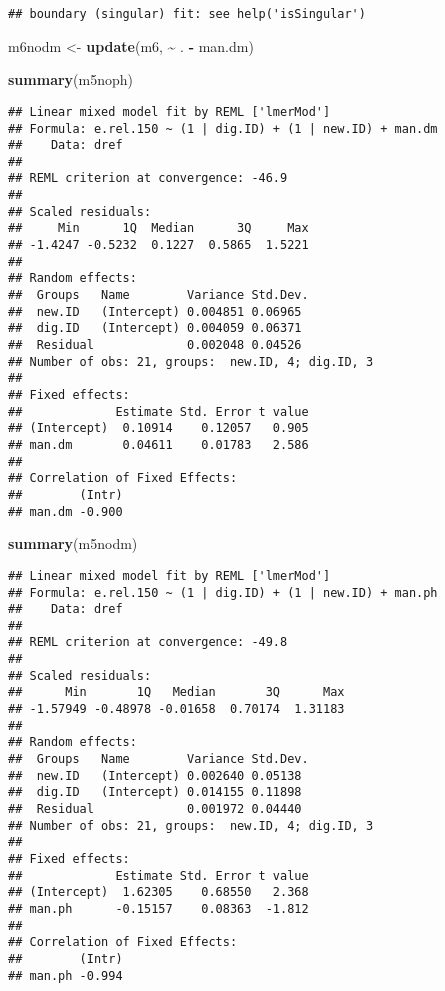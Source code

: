 \documentclass[
]{article}
\newenvironment{Shaded}{\begin{snugshade}}{\end{snugshade}}
\newcommand{\FunctionTok}[1]{\textcolor[rgb]{0.13,0.29,0.53}{\textbf{#1}}}
\newcommand{\NormalTok}[1]{#1}
\newcommand{\OtherTok}[1]{\textcolor[rgb]{0.56,0.35,0.01}{#1}}
\newcommand{\SpecialCharTok}[1]{\textcolor[rgb]{0.81,0.36,0.00}{\textbf{#1}}}
\begin{document}
\begin{verbatim}
## boundary (singular) fit: see help('isSingular')
\end{verbatim}

\begin{Shaded}
\begin{Highlighting}[]
\NormalTok{m6nodm }\OtherTok{\textless{}{-}} \FunctionTok{update}\NormalTok{(m6, }\SpecialCharTok{\textasciitilde{}}\NormalTok{ . }\SpecialCharTok{{-}}\NormalTok{ man.dm)}
\end{Highlighting}
\end{Shaded}

\begin{Shaded}
\begin{Highlighting}[]
\FunctionTok{summary}\NormalTok{(m5noph)}
\end{Highlighting}
\end{Shaded}

\begin{verbatim}
## Linear mixed model fit by REML ['lmerMod']
## Formula: e.rel.150 ~ (1 | dig.ID) + (1 | new.ID) + man.dm
##    Data: dref
## 
## REML criterion at convergence: -46.9
## 
## Scaled residuals: 
##     Min      1Q  Median      3Q     Max 
## -1.4247 -0.5232  0.1227  0.5865  1.5221 
## 
## Random effects:
##  Groups   Name        Variance Std.Dev.
##  new.ID   (Intercept) 0.004851 0.06965 
##  dig.ID   (Intercept) 0.004059 0.06371 
##  Residual             0.002048 0.04526 
## Number of obs: 21, groups:  new.ID, 4; dig.ID, 3
## 
## Fixed effects:
##             Estimate Std. Error t value
## (Intercept)  0.10914    0.12057   0.905
## man.dm       0.04611    0.01783   2.586
## 
## Correlation of Fixed Effects:
##        (Intr)
## man.dm -0.900
\end{verbatim}

\begin{Shaded}
\begin{Highlighting}[]
\FunctionTok{summary}\NormalTok{(m5nodm)}
\end{Highlighting}
\end{Shaded}

\begin{verbatim}
## Linear mixed model fit by REML ['lmerMod']
## Formula: e.rel.150 ~ (1 | dig.ID) + (1 | new.ID) + man.ph
##    Data: dref
## 
## REML criterion at convergence: -49.8
## 
## Scaled residuals: 
##      Min       1Q   Median       3Q      Max 
## -1.57949 -0.48978 -0.01658  0.70174  1.31183 
## 
## Random effects:
##  Groups   Name        Variance Std.Dev.
##  new.ID   (Intercept) 0.002640 0.05138 
##  dig.ID   (Intercept) 0.014155 0.11898 
##  Residual             0.001972 0.04440 
## Number of obs: 21, groups:  new.ID, 4; dig.ID, 3
## 
## Fixed effects:
##             Estimate Std. Error t value
## (Intercept)  1.62305    0.68550   2.368
## man.ph      -0.15157    0.08363  -1.812
## 
## Correlation of Fixed Effects:
##        (Intr)
## man.ph -0.994
\end{verbatim}
\end{document}
